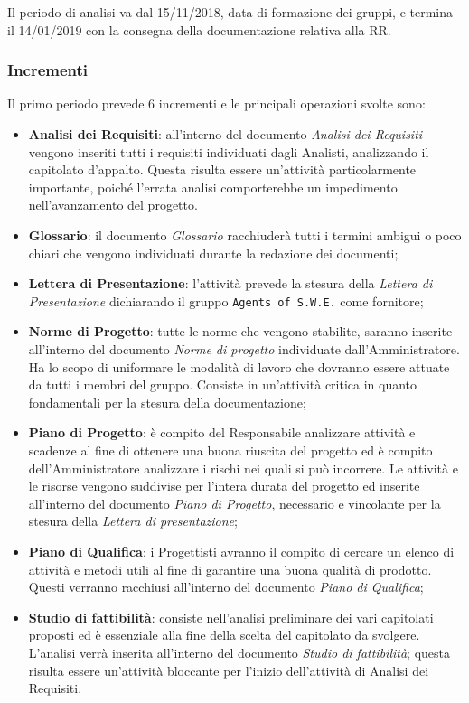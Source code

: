 Il periodo di analisi va dal 15/11/2018, data di formazione dei gruppi, e termina il 14/01/2019 con la consegna della documentazione relativa alla RR.

\newpage
\subsubsection{Incrementi}

Il primo periodo prevede 6 incrementi e le principali operazioni svolte sono: 
\begin{itemize}
	\item \textbf{Analisi dei Requisiti}: all'interno del documento \textit{Analisi dei Requisiti} vengono inseriti tutti i requisiti individuati dagli Analisti, analizzando il capitolato d'appalto. Questa risulta essere un'attività particolarmente importante, poiché l'errata analisi comporterebbe un impedimento nell'avanzamento del progetto.
	\item \textbf{Glossario}: il documento \textit{Glossario} racchiuderà tutti i termini ambigui o poco chiari che vengono individuati durante la redazione dei documenti;
	\item \textbf{Lettera di Presentazione}: l'attività prevede la stesura della \textit{Lettera di Presentazione} dichiarando il gruppo \texttt{Agents of S.W.E.} come fornitore;
	\item \textbf{Norme di Progetto}: tutte le norme che vengono stabilite, saranno inserite all'interno del documento \textit{Norme di progetto} individuate dall'Amministratore. Ha lo scopo di uniformare le modalità di lavoro che dovranno essere attuate da tutti i membri del gruppo. Consiste in un'attività critica in quanto fondamentali per la stesura della documentazione;
	\item \textbf{Piano di Progetto}: è compito del Responsabile analizzare attività e scadenze al fine di ottenere una buona riuscita del progetto ed è compito dell'Amministratore analizzare i rischi nei quali si può incorrere. Le attività e le risorse vengono suddivise per l'intera durata del progetto ed inserite all'interno del documento \textit{Piano di Progetto}, necessario e vincolante per la stesura della \textit{Lettera di presentazione};
	\item \textbf{Piano di Qualifica}: i Progettisti avranno il compito di cercare un elenco di attività e metodi utili al fine di garantire una buona qualità di prodotto. Questi verranno racchiusi all'interno del documento \textit{Piano di Qualifica};
	\item \textbf{Studio di fattibilità}: consiste nell'analisi preliminare dei vari capitolati proposti ed è essenziale alla fine della scelta del capitolato da svolgere. L'analisi verrà inserita all'interno del documento \textit{Studio di fattibilità}; questa risulta essere un'attività bloccante per l'inizio dell'attività di Analisi dei Requisiti.  
\end{itemize}

